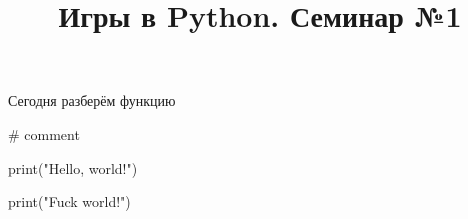 \documentclass{article}
\title{Игры в Python. Семинар №1}
\author{}
\date{}
\begin{document}
\maketitle

Сегодня разберём функцию 

\begin{python}
    # comment

    print("Hello, world!")

    print("Fuck world!")
\end{python}
\end{document}

